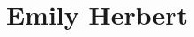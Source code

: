 \documentclass{article}
\newcommand{\CVAuthor}{Emily Herbert}
\begin{document}
\title{\CVAuthor}

\maketitle
\end{document}
